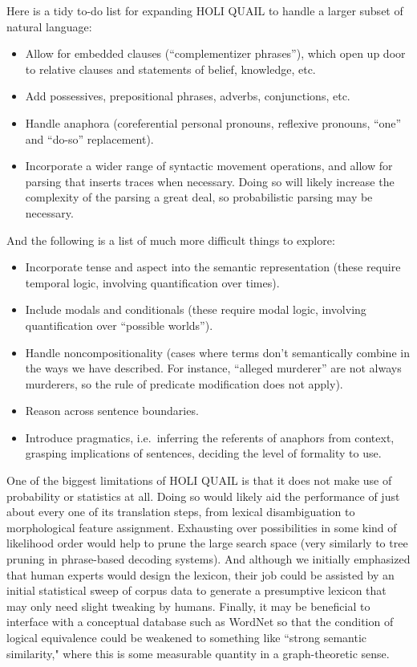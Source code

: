 \documentclass[11pt, oneside]{article}      %
\begin{document}
Here is a tidy to-do list for expanding HOLI QUAIL to handle a larger subset of natural language: 
\begin{itemize}
\item Allow for embedded clauses (``complementizer phrases''), which open up door to relative clauses and statements of belief, knowledge, etc.
\item Add possessives, prepositional phrases, adverbs, conjunctions, etc.
\item Handle anaphora (coreferential personal pronouns, reflexive pronouns, ``one'' and ``do-so'' replacement).
\item Incorporate a wider range of syntactic movement operations, and allow for parsing that inserts traces when necessary.  Doing so will likely increase the complexity of the parsing a great deal, so probabilistic parsing may be necessary.
\end{itemize}

And the following is a list of much more difficult things to explore:
\begin{itemize}
\item Incorporate tense and aspect into the semantic representation (these require temporal logic, involving quantification over times).
\item Include modals and conditionals (these require modal logic, involving quantification over ``possible worlds'').
\item Handle noncompositionality (cases where terms don't semantically combine in the ways we have described.  For instance, ``alleged murderer'' are not always murderers, so the rule of predicate modification does not apply).
\item Reason across sentence boundaries.
\item Introduce pragmatics, i.e.\ inferring the referents of anaphors from context, grasping implications of sentences, deciding the level of formality to use.
\end{itemize}

One of the biggest limitations of HOLI QUAIL is that it does not make use of probability or statistics at all.  Doing so would likely aid the performance of just about every one of its translation steps, from lexical disambiguation to morphological feature assignment.  Exhausting over possibilities in some kind of likelihood order would help to prune the large search space (very similarly to tree pruning in phrase-based decoding systems).  And although we initially emphasized that human experts would design the lexicon, their job could be assisted by an initial statistical sweep of corpus data to generate a presumptive lexicon that may only need slight tweaking by humans.  Finally, it may be beneficial to interface with a conceptual database such as WordNet so that the condition of logical equivalence could be weakened to something like ``strong semantic similarity," where this is some measurable quantity in a graph-theoretic sense.
\end{document}

